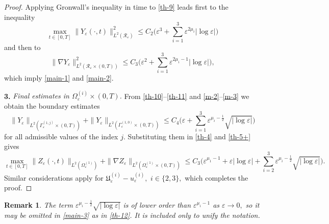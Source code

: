 \documentclass[reqno]{amsart}            %
\newtheorem{remark}{Remark}[section]
\numberwithin{equation}{section}
\begin{document}
\begin{proof}
		
		Applying  Gronwall's inequality in time to \eqref{th-9} leads first to the inequality
		\begin{equation}\label{th-10}
			\max_{t\in[0,T]} \|Y_\varepsilon(\cdot,t)\|^2_{L^2(\mathcal{R}_\varepsilon)} \le C_2 \Big(\varepsilon^3 +  \sum_{i=1}^{3} \varepsilon^{2 \mu_i} |\log\varepsilon|\Big)
		\end{equation}
		and then to 
		\begin{equation}\label{th-11}
			\big\| {\nabla Y_\varepsilon}\big\|^2_{L^2(\mathcal{R}_\varepsilon\times (0, T))} \le C_3
			\Big(\varepsilon^2 + \sum_{i=1}^{3} \varepsilon^{2 \mu_i - 1} |\log\varepsilon| 
			\Big),
		\end{equation}	
		which imply \eqref{main-1} and \eqref{main-2}.
		
		
		\textbf{3.} \emph{Final estimates in $\Omega_\varepsilon^{(i)}\times (0,T)$.} 
		From \eqref{th-10}--\eqref{th-11} and \eqref{m-2}--\eqref{m-3} we obtain the boundary estimates 
		\begin{equation*}
			\|Y_\varepsilon\|_{L^2(\Gamma_\varepsilon^{(1,j)}\times (0,T))} + \|Y_\varepsilon\|_{L^2(\Gamma_\varepsilon^{(1,0)}\times (0,T))} \le C_4
			\Big(\varepsilon + \sum_{i=1}^{3} \varepsilon^{\mu_i - \frac12} \sqrt{|\log\varepsilon|} 
			\Big)
		\end{equation*}
		for all admissible values of the index $j.$ 	
		Substituting them in \eqref{th-4} and \eqref{th-5+} gives 
		\begin{equation}\label{th-12}
			\max_{t\in[0,T]}\|Z_\varepsilon(\cdot,t)\|_{L^2(\Omega_\varepsilon^{(1)})} +	\|\nabla Z_\varepsilon\|_{L^2(\Omega_\varepsilon^{(1)}\times(0,T))} \le C_3 \Big(\varepsilon^{\mu_1 -1} + \varepsilon |\log\varepsilon| + \sum_{i=2}^{3} \varepsilon^{\mu_i - \frac12} \sqrt{|\log\varepsilon|}
			\Big).
		\end{equation}
		Similar considerations apply for $\mathfrak{U}^{(i)}_\varepsilon - u^{(i)}_\varepsilon,$ $i \in \{2, 3\},$  which completes the proof. 
	\end{proof}
	\begin{remark}
		The term $\varepsilon^{\mu_i - \frac12} \sqrt{|\log\varepsilon|}$ is of lower order than $\varepsilon^{\mu_i - 1}$  as $\varepsilon \to 0,$	
		so it may be omitted in \eqref{main-3} as in \eqref{th-12}. It is included only to unify the notation.	
	\end{remark}	
	
\end{document}
